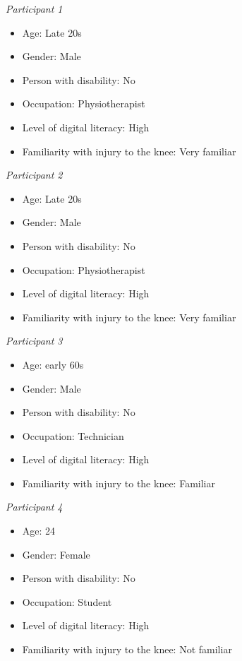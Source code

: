 \documentclass[12pt, titlepage]{article}
\begin{document}
\textit{Participant 1}
\begin{itemize}
    \item Age: Late 20s
    \item Gender: Male
    \item Person with disability: No
    \item Occupation: Physiotherapist
    \item Level of digital literacy: High
    \item Familiarity with injury to the knee: Very familiar
\end{itemize}

\textit{Participant 2}
\begin{itemize}
    \item Age: Late 20s
    \item Gender: Male
    \item Person with disability: No 
    \item Occupation: Physiotherapist
    \item Level of digital literacy: High
    \item Familiarity with injury to the knee: Very familiar
\end{itemize}

\textit{Participant 3}
\begin{itemize}
    \item Age: early 60s
    \item Gender: Male
    \item Person with disability: No
    \item Occupation: Technician
    \item Level of digital literacy: High
    \item Familiarity with injury to the knee: Familiar
\end{itemize}

\textit{Participant 4}
\begin{itemize}
    \item Age: 24
    \item Gender: Female
    \item Person with disability: No
    \item Occupation: Student
    \item Level of digital literacy: High
    \item Familiarity with injury to the knee: Not familiar
\end{itemize}
\end{document}
